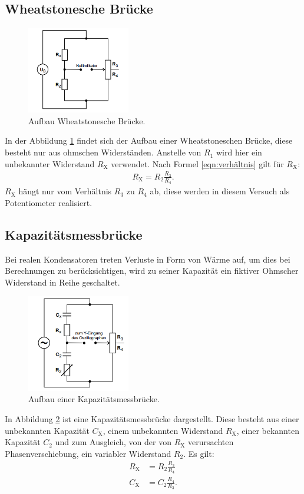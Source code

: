 \subsection{Wheatstonesche Brücke}
\begin{figure}
 \centering
 \includegraphics[width=0.4\textwidth]{wheat.PNG}
 \caption{Aufbau Wheatstonesche Brücke.}
 \label{fig:wheat}
 \end{figure}
In der Abbildung \ref{fig:wheat} findet sich der Aufbau einer Wheatstoneschen Brücke, diese besteht nur aus ohmschen Widerständen.
Anstelle von $R_\mathrm{1}$ wird hier ein unbekannter Widerstand $R_\mathrm{X}$ verwendet.
Nach Formel \eqref{eqn:verhältnis} gilt für $R_\mathrm{X}$:
\begin{align}
  R_\mathrm{X}=R_\mathrm{2}\frac{R_\mathrm{3}}{R_\mathrm{4}}.
\end{align}
$R_\mathrm{X}$ hängt nur vom Verhältnis $R_\mathrm{3}$ zu $R_\mathrm{4}$ ab, diese werden in diesem Versuch als Potentiometer realisiert.\\
\subsection{Kapazitätsmessbrücke}
Bei realen Kondensatoren treten Verluste in Form von Wärme auf, um dies bei Berechnungen zu berücksichtigen, wird zu seiner Kapazität ein fiktiver Ohmscher Widerstand in Reihe geschaltet.
\begin{figure}
 \centering
 \includegraphics[width=0.4\textwidth]{kapazitaet.PNG}
 \caption{Aufbau einer Kapazitätsmessbrücke.}
 \label{fig:kapazitaet}
 \end{figure}
In Abbildung \ref{fig:kapazitaet} ist eine Kapazitätsmessbrücke dargestellt. Diese besteht aus einer unbekannten Kapazität $C_\mathrm{X}$,
einem unbekannten Widerstand $R_\mathrm{X}$, einer bekannten Kapazität $C_\mathrm{2}$ und zum Ausgleich, von der von $R_\mathrm{X}$ verursachten Phasenverschiebung,
ein variabler Widerstand $R_\mathrm{2}$.
Es gilt:
\begin{align}
  R_\mathrm{X}&=R_\mathrm{2}\frac{R_\mathrm{3}}{R_\mathrm{4}}\\
  C_\mathrm{X}&=C_\mathrm{2}\frac{R_\mathrm{4}}{R_\mathrm{3}}.
\end{align}\\
